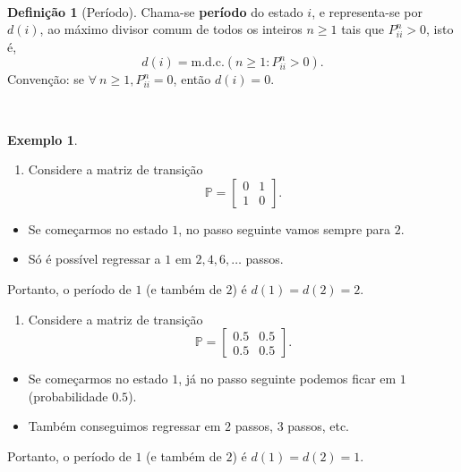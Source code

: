 \documentclass[
  11pt,
  a4paper,
]{book}
\providecommand{\tightlist}{%
  \setlength{\itemsep}{0pt}\setlength{\parskip}{0pt}}
\theoremstyle{definition}
\newtheorem{definition}{Definição}[chapter]
\theoremstyle{definition}
\newtheorem{example}{Exemplo}[chapter]
\theoremstyle{definition}
\theoremstyle{definition}
\theoremstyle{remark}
\begin{document}
\(\,\)

\begin{definition}[Período]
Chama-se \textbf{período} do estado \(i\), e representa-se por \(d(i)\), ao máximo divisor comum de todos os inteiros \(n\geq 1\) tais que \(P_{ii}^n > 0\), isto é,
\[d(i)=\text{m.d.c.}(n \geq 1: P_{ii}^n >0).\]
Convenção: se \(\forall ~n \geq 1, P_{ii}^n=0\), então \(d(i)=0\).
\end{definition}

\(\,\)

\begin{example}
\leavevmode

\begin{enumerate}
\def\labelenumi{\arabic{enumi}.}
\tightlist
\item
  Considere a matriz de transição
  \[
  \mathbb{P} = \begin{bmatrix}
  0 & 1 \\
  1 & 0
  \end{bmatrix}.
  \]
\end{enumerate}

\begin{itemize}
\tightlist
\item
  Se começarmos no estado \(1\), no passo seguinte vamos sempre para \(2\).\\
\item
  Só é possível regressar a \(1\) em \(2,4,6,\dots\) passos.
\end{itemize}

Portanto, o período de \(1\) (e também de \(2\)) é \(d(1)=d(2)=2\).

\begin{enumerate}
\def\labelenumi{\arabic{enumi}.}
\setcounter{enumi}{1}
\tightlist
\item
  Considere a matriz de transição
  \[
  \mathbb{P} = \begin{bmatrix}
  0.5 & 0.5 \\
  0.5 & 0.5
  \end{bmatrix}.
  \]
\end{enumerate}

\begin{itemize}
\tightlist
\item
  Se começarmos no estado \(1\), já no passo seguinte podemos ficar em \(1\) (probabilidade \(0.5\)).\\
\item
  Também conseguimos regressar em \(2\) passos, \(3\) passos, etc.
\end{itemize}

Portanto, o período de \(1\) (e também de \(2\)) é \(d(1)=d(2)=1\).

\end{example}
\end{document}

